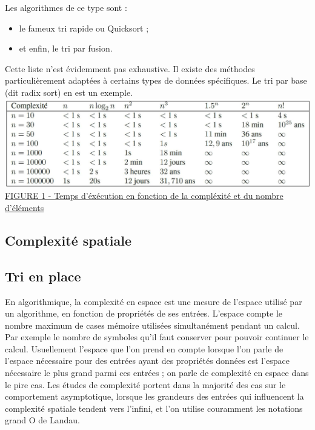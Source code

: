 \documentclass[11pt,a4paper]{article}
\begin{document}
\begin{itemize}
          Les algorithmes de ce type sont :
          \begin{itemize}

              \item le fameux tri rapide ou Quicksort ;
              \item et enfin, le tri par fusion.
          \end{itemize}
          \vspace{0.1cm}

          Cette liste n’est évidemment pas exhaustive. Il existe des méthodes particulièrement adaptées à certains types de données spécifiques.
          Le tri par base (dit radix sort) en est un exemple.
          \newline
          \newline
          \includegraphics[scale = 0.5]{Images/O(n).jpg}
          \underline {FIGURE 1 - Temps d'éxécution en fonction de la compléxité et du nombre d'éléments}


\end{itemize}

\subsection{Complexité spatiale}
\subsection{Tri en place}
En algorithmique, la complexité en espace est une mesure de l'espace utilisé par un algorithme, en fonction de propriétés de ses entrées.
L'espace compte le nombre maximum de cases mémoire utilisées simultanément pendant un calcul. Par exemple le nombre de symboles qu'il faut
conserver pour pouvoir continuer le calcul. Usuellement l'espace que l'on prend en compte lorsque l'on parle de l'espace nécessaire pour des
entrées ayant des propriétés données est l'espace nécessaire le plus grand parmi ces entrées ; on parle de complexité en espace dans le pire cas.
Les études de complexité portent dans la majorité des cas sur le comportement asymptotique, lorsque les grandeurs des entrées qui influencent la
complexité spatiale tendent vers l'infini, et l'on utilise couramment les notations grand O de Landau.
\end{document}
